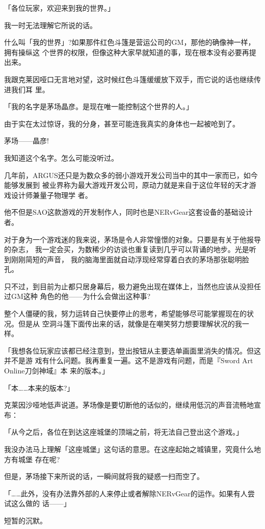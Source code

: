 \documentclass[11pt]{book}
\begin{document}
「各位玩家，欢迎来到我的世界。」

我一时无法理解它所说的话。

什么叫「我的世界」?如果那件红色斗篷是营运公司的GM，那他的确像神一样，拥有操纵这
个世界的权限，但像这种大家早就知道的事，现在根本没有必要再提出来。

我跟克莱因哑口无言地对望，这时候红色斗篷缓缓放下双手，而它说的话也继续传进我们耳
里。

「我的名字是茅场晶彦。是现在唯一能控制这个世界的人。」

由于实在太过惊讶，我的分身，甚至可能连我真实的身体也一起被呛到了。

茅场——晶彦!

我知道这个名字。怎么可能没听过。

几年前，ARGUS还只是为数众多的弱小游戏开发公司当中的其中一家而已，如今能够发展到
被业界称为最大游戏开发公司，原动力就是来自于这位年轻的天才游戏设计师兼量子物理学
者。

他不但是SAO这款游戏的开发制作人，同时也是NERvGear这套设备的基础设计者。

对于身为一个游戏迷的我来说，茅场是令人非常憧憬的对象。只要是有关于他报导的杂志，
我一定会买，为数稀少的访谈也重复读到几乎可以背诵的地步。光是听到刚刚简短的声音，
我的脑海里面就自动浮现经常穿着白衣的茅场那张聪明脸孔。

只不过，到目前为止都只居身幕后，极力避免出现在媒体上，当然也应该从没担任过GM这种
角色的他——为什么会做出这种事?

整个人僵硬的我，努力运转自己快要停止的思考，希望能够尽可能掌握现在的状况。但是从
空洞斗篷下面传出来的话，就像是在嘲笑努力想要理解状况的我一样。

「我想各位玩家应该都已经注意到，登出按钮从主要选单画面里消失的情况。但这并不是游
戏有什么问题。我再重复一遍。这不是游戏有问题，而是『Sword Art Online刀剑神域』本
来的版本。」

「本……本来的版本?」

克莱因沙哑地低声说道。茅场像是要切断他的话似的，继续用低沉的声音流畅地宣布：

「从今之后，各位在到达这座城堡的顶端之前，将无法自己登出这个游戏。」

我没办法马上理解「这座城堡」这句话的意思。在这座起始之城镇里，究竟什么地方有城堡
存在呢?

但是，茅场接下来所说的话，一瞬间就将我的疑惑一扫而空了。

「……此外，没有办法靠外部的人来停止或者解除NERvGear的运作。如果有人尝试这么做的
话——」

短暂的沉默。
\end{document}
